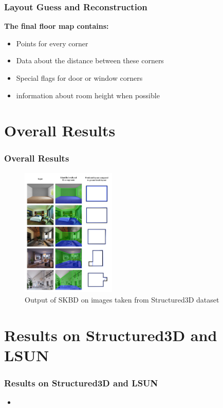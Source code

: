 \documentclass{beamer}
\begin{document}
\begin{frame}
\frametitle{Layout Guess and Reconstruction}
\textbf{The final floor map contains:}
\begin{itemize}
    \item Points for every corner
    \item Data about the distance between these corners
    \item Special flags for door or window corners
    \item information about room height when possible
\end{itemize}
\end{frame}


\section{Overall Results}
\begin{frame}
\frametitle{Overall Results}
\begin{figure}[htbp]
\centering
    \includegraphics[width=0.4\textwidth]{images/results2.png}
    \caption{Output of SKBD on images taken from Structured3D dataset}
    \label{fig:overall_results}
\end{figure}
\end{frame}

\section{Results on Structured3D and LSUN}
\begin{frame}
\frametitle{Results on Structured3D and LSUN}
\begin{itemize}
    \item 
\end{itemize}
\end{frame}
\end{document}
